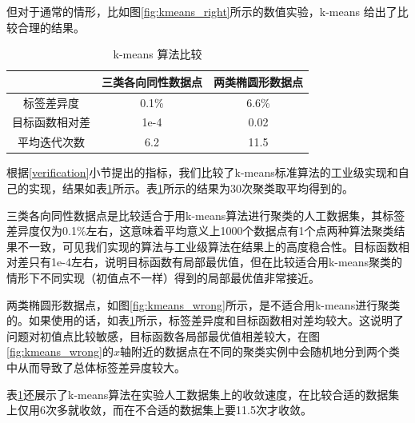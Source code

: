 \documentclass{ctexart}
\theoremstyle{definition}
\theoremstyle{remark}
\begin{document}
但对于通常的情形，比如图\ref{fig:kmeans_right}所示的数值实验，k-means 给出了比较合理的结果。

\begin{table}[!ht]
\centering
\begin{tabular}{ccc}
\hline
& 三类各向同性数据点 & 两类椭圆形数据点 \\
\hline
标签差异度 & 0.1\% & 6.6\% \\
目标函数相对差 & 1e-4 & 0.02 \\
平均迭代次数 & 6.2 & 11.5 \\
\hline
\end{tabular}
\caption{k-means 算法比较}\label{tb:compare}
\end{table}

根据\ref{verification}小节提出的指标，我们比较了k-means标准算法的工业级实现和自己的实现，结果如表\ref{tb:compare}所示。表\ref{tb:compare}所示的结果为30次聚类取平均得到的。

三类各向同性数据点是比较适合于用k-means算法进行聚类的人工数据集，其标签差异度仅为0.1\%左右，这意味着平均意义上1000个数据点有1个点两种算法聚类结果不一致，可见我们实现的算法与工业级算法在结果上的高度稳合性。目标函数相对差只有1e-4左右，说明目标函数有局部最优值，但在比较适合用k-means聚类的情形下不同实现（初值点不一样）得到的局部最优值非常接近。

两类椭圆形数据点，如图\ref{fig:kmeans_wrong}所示，是不适合用k-means进行聚类的。如果使用的话，如表\ref{tb:compare}所示，标签差异度和目标函数相对差均较大。这说明了问题对初值点比较敏感，目标函数各局部最优值相差较大，在图\ref{fig:kmeans_wrong}的$x$轴附近的数据点在不同的聚类实例中会随机地分到两个类中从而导致了总体标签差异度较大。

表\ref{tb:compare}还展示了k-means算法在实验人工数据集上的收敛速度，在比较合适的数据集上仅用6次多就收敛，而在不合适的数据集上要11.5次才收敛。
\end{document}
